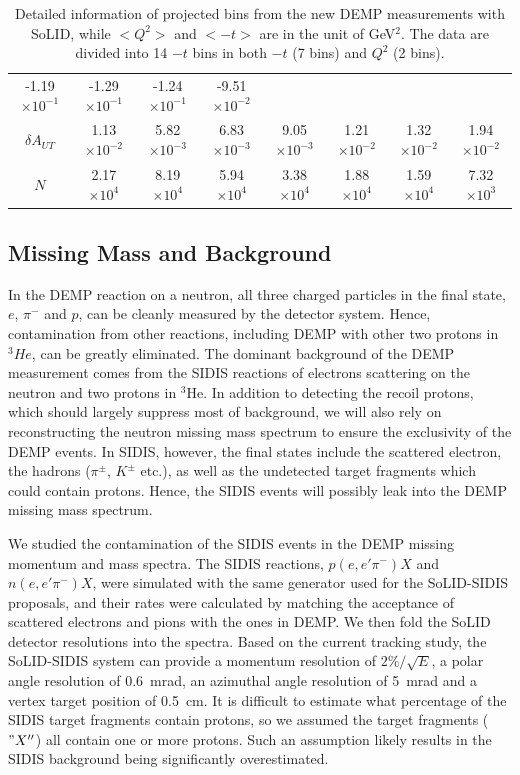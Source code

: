\begin{table}[!ht]
\begin{tabular}{|c|c|c|c|c|c|c|c|}
-1.19$\times 10^{-1}$ & -1.29$\times 10^{-1}$ & -1.24$\times 10^{-1}$ & -9.51$\times 10^{-2}$ \\
$\delta A_{UT}$&  1.13$\times 10^{-2}$ &  5.82$\times 10^{-3}$ & 6.83$\times 10^{-3}$ 
& 9.05$\times 10^{-3}$ & 1.21$\times 10^{-2}$ & 1.32$\times 10^{-2}$ & 1.94$\times 10^{-2}$ \\
$N$          &  2.17$\times 10^{4}$ &  8.19$\times 10^{4}$ & 5.94$\times 10^{4}$ &
  3.38$\times 10^{4}$ & 1.88$\times 10^{4}$ & 1.59$\times 10^{4}$ & 7.32$\times 10^{3}$ \\
\hline
\end{tabular}
\caption[Detailed information of projected bins]{\footnotesize{Detailed
information of projected bins from the new DEMP measurements with SoLID, while
$<Q^{2}>$ and $<-t>$ are in the unit of GeV$^{2}$. The data are
divided into 14 $-t$ bins in both $-t$ (7 bins) and $Q^{2}$ (2 bins).}}
\label{asym_bin_table}
\end{table} 

\subsection{Missing Mass and Background}

In the DEMP reaction on a neutron, all three charged particles in the final state, $e$, $\pi^{-}$ and $p$,
can be cleanly measured by the detector system.  Hence, contamination from other reactions, including
DEMP with other two protons in $^{3}He$, can be greatly eliminated.  The
dominant background of the DEMP measurement comes from the SIDIS reactions of
electrons scattering on the neutron and two protons in $\mathrm{^{3}He}$. In
addition to detecting the recoil protons, which should largely suppress most of
background, we will also rely on reconstructing the neutron missing mass
spectrum to ensure the exclusivity of the DEMP events. In SIDIS, however, the
final states include the scattered electron, the hadrons ($\pi^{\pm}$,
$K^{\pm}$ etc.), as well as the undetected target fragments which could contain
protons. Hence, the SIDIS events will possibly leak into the DEMP missing mass
spectrum.

We studied the contamination of the SIDIS events in the DEMP missing momentum
and mass spectra. The SIDIS reactions, $p(e,e'\pi^{-})X$ and $n(e,e'\pi^{-})X$,
were simulated with the same generator used for the SoLID-SIDIS proposals, and
their rates were calculated by matching the acceptance of scattered electrons
and pions with the ones in DEMP. We then fold the SoLID detector resolutions
into the spectra. Based on the current tracking study, the SoLID-SIDIS system
can provide a momentum resolution of $2\%/\sqrt{E}$, a polar angle
resolution of 0.6~mrad, an azimuthal angle resolution of 5~mrad and a
vertex target position of 0.5~cm. It is difficult to estimate what
percentage of the SIDIS target fragments contain protons, so we assumed
the target fragments ($"X''$) all contain one or more protons. Such an
assumption likely results in the SIDIS background being significantly
overestimated.

